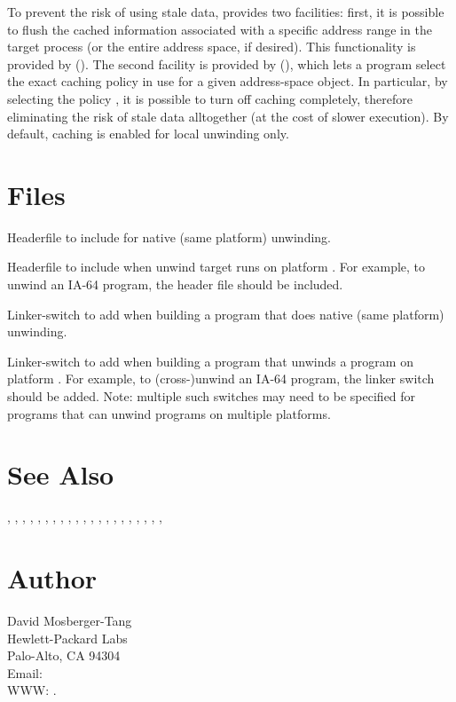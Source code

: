 \documentclass{article}
\begin{document}
To prevent the risk of using stale data,  provides two
facilities: first, it is possible to flush the cached information
associated with a specific address range in the target process (or the
entire address space, if desired).  This functionality is provided by
().  The second facility is provided by
(), which lets a program
select the exact caching policy in use for a given address-space
object.  In particular, by selecting the policy
, it is possible to turn off caching
completely, therefore eliminating the risk of stale data alltogether
(at the cost of slower execution).  By default, caching is enabled for
local unwinding only.


\section{Files}

\begin{Description}
\item[\File{libunwind.h}] Headerfile to include for native (same
  platform) unwinding.
\item[\File{libunwind-}\Var{PLAT}\File{.h}] Headerfile to include when
  unwind target runs on platform .  For example, to unwind
  an IA-64 program, the header file  should be
  included.
\item[\Opt{-l}\File{unwind}] Linker-switch to add when building a
  program that does native (same platform) unwinding.
\item[\Opt{-l}\File{unwind-}\Var{PLAT}] Linker-switch to add when
  building a program that unwinds a program on platform .
  For example, to (cross-)unwind an IA-64 program, the linker switch
   should be added.  Note: multiple such switches
  may need to be specified for programs that can unwind programs on
  multiple platforms.
\end{Description}

\section{See Also}

,
,
,
,
,
,
,
,
,
,
,
,
,
,
,
,
,
,
,
,
,

\section{Author}

\noindent
David Mosberger-Tang\\
Hewlett-Packard Labs\\
Palo-Alto, CA 94304\\
Email: \\
WWW: .
\LatexManEnd
\end{document}
